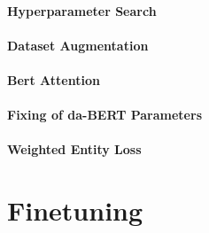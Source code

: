 \documentclass[main.tex]{subfiles}
\begin{document}
\paragraph{Hyperparameter Search}

\paragraph{Dataset Augmentation}

\paragraph{Bert Attention}

\paragraph{Fixing of da-BERT Parameters}

\paragraph{Weighted Entity Loss}

\section{Finetuning}
\label{sec:finetuning}
\end{document}
